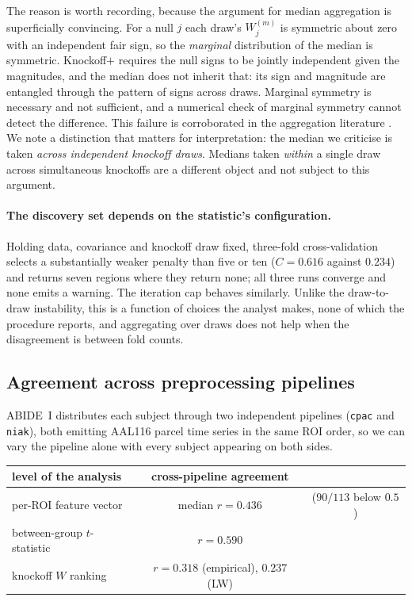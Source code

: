 \documentclass[11pt,a4paper]{article}
\begin{document}
The reason is worth recording, because the argument for median aggregation
is superficially convincing. For a null $j$ each draw's $W_j^{(m)}$ is
symmetric about zero with an independent fair sign, so the \emph{marginal}
distribution of the median is symmetric. Knockoff$+$ requires the null signs
to be jointly independent given the magnitudes, and the median does not
inherit that: its sign and magnitude are entangled through the pattern of
signs across draws. Marginal symmetry is necessary and not sufficient, and a
numerical check of marginal symmetry cannot detect the difference. This
failure is corroborated in the aggregation literature \citep{nguyen2020ako}.
We note a distinction that matters for interpretation: the median we
criticise is taken \emph{across independent knockoff draws}. Medians taken
\emph{within} a single draw across simultaneous knockoffs are a different
object and not subject to this argument.

\paragraph{The discovery set depends on the statistic's configuration.}
Holding data, covariance and knockoff draw fixed, three-fold
cross-validation selects a substantially weaker penalty than five or ten
($C=0.616$ against $0.234$) and returns seven regions where they return
none; all three runs converge and none emits a warning. The iteration cap
behaves similarly. Unlike the draw-to-draw instability, this is a function
of choices the analyst makes, none of which the procedure reports, and
aggregating over draws does not help when the disagreement is between fold
counts.

\subsection{Agreement across preprocessing pipelines}
\label{sec:pipeline}

ABIDE~I distributes each subject through two independent pipelines
(\texttt{cpac} and \texttt{niak}), both emitting AAL116 parcel time series
in the same ROI order, so we can vary the pipeline alone with every subject
appearing on both sides.

\begin{center}
{\small\setlength{\tabcolsep}{5pt}
\begin{tabular}{lcc}
\toprule
level of the analysis & cross-pipeline agreement & \\
\midrule
per-ROI feature vector & median $r=0.436$ & ($90/113$ below $0.5$) \\
between-group $t$-statistic & $r=0.590$ & \\
knockoff $W$ ranking & $r=0.318$ (empirical), $0.237$ (LW) & \\
\bottomrule
\end{tabular}}
\end{center}
\end{document}
